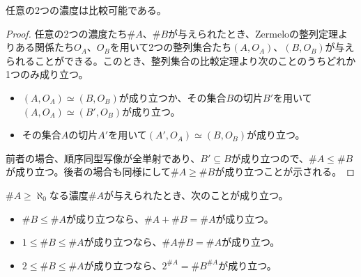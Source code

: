 \documentclass[dvipdfmx]{jsarticle}
\begin{document}
\begin{thm}\label{1.3.3.12}
任意の2つの濃度は比較可能である。
\end{thm}
\begin{proof}
任意の2つの濃度たち$\# A$、$\# B$が与えられたとき、Zermeloの整列定理よりある関係たち$O_{A}$、$O_{B}$を用いて2つの整列集合たち$\left( A,O_{A} \right)$、$\left( B,O_{B} \right)$が与えられることができる。このとき、整列集合の比較定理より次のことのうちどれか1つのみ成り立つ。
\begin{itemize}
\item
  $\left( A,O_{A} \right) \simeq \left( B,O_{B} \right)$が成り立つか、その集合$B$の切片$B'$を用いて$\left( A,O_{A} \right) \simeq \left( B',O_{B} \right)$が成り立つ。
\item
  その集合$A$の切片$A'$を用いて$\left( A',O_{A} \right) \simeq \left( B,O_{B} \right)$が成り立つ。
\end{itemize}
前者の場合、順序同型写像が全単射であり、$B' \subseteq B$が成り立つので、$\# A \leq \# B$が成り立つ。後者の場合も同様にして$\# A \geq \# B$が成り立つことが示される。
\end{proof}
\begin{thm}\label{1.3.3.13}
$\# A \geq \aleph_{0}$なる濃度$\# A$が与えられたとき、次のことが成り立つ。
\begin{itemize}
\item
  $\# B \leq \# A$が成り立つなら、$\# A + \# B = \# A$が成り立つ。
\item
  $1 \leq \# B \leq \# A$が成り立つなら、$\# A\# B = \# A$が成り立つ。
\item
  $2 \leq \# B \leq \# A$が成り立つなら、$2^{\# A} = {\# B}^{\# A}$が成り立つ。
\end{itemize}
\end{thm}
\end{document}
